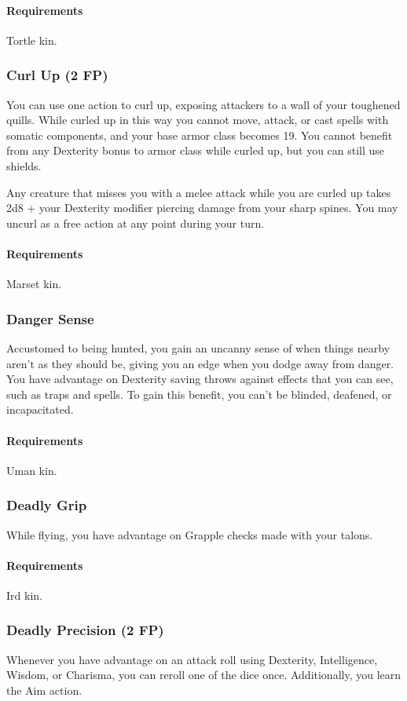     \paragraph{Requirements} Tortle kin.
\subsubsection{Curl Up (2 FP)} \label{feat::curlup}
    You can use one action to curl up, exposing attackers to a wall of your toughened quills.
    While curled up in this way you cannot move, attack, or cast spells with somatic components, and your base armor class becomes 19.
    You cannot benefit from any Dexterity bonus to armor class while curled up, but you can still use shields.

    Any creature that misses you with a melee attack while you are curled up takes 2d8 + your Dexterity modifier piercing damage from your sharp spines.
    You may uncurl as a free action at any point during your turn.
    \paragraph{Requirements} Marset kin.
\subsubsection{Danger Sense} \label{feat::dangersense}
    Accustomed to being hunted, you gain an uncanny sense of when things nearby aren't as they should be, giving you an edge when you dodge away from danger.
    You have advantage on Dexterity saving throws against effects that you can see, such as traps and spells.
    To gain this benefit, you can't be blinded, deafened, or incapacitated.
    \paragraph{Requirements} Uman kin.
\subsubsection{Deadly Grip} \label{feat::deadlygrip}
    While flying, you have advantage on Grapple checks made with your talons.
    \paragraph{Requirements} Ird kin.
\subsubsection{Deadly Precision (2 FP)} \label{feat::deadlyprecision}
    Whenever you have advantage on an attack roll using Dexterity, Intelligence, Wisdom, or Charisma, you can reroll one of the dice once.
    Additionally, you learn the Aim action.
